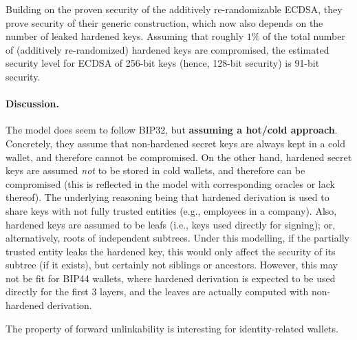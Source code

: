 Building on the proven security of the additively re-randomizable ECDSA, they
prove security of their generic construction, which now also depends on the
number of leaked hardened keys. Assuming that roughly $1\%$ of the total number
of (additively re-randomized) hardened keys are compromised, the estimated
security level for ECDSA of 256-bit keys (hence, 128-bit security) is 91-bit
security.

\paragraph{Discussion.} %
The model does seem to follow BIP32, but \textbf{assuming a hot/cold approach}.
Concretely, they assume that non-hardened secret keys are always kept in a cold
wallet, and therefore cannot be compromised. On the other hand, hardened secret
keys are assumed \emph{not} to be stored in cold wallets, and therefore can be
compromised (this is reflected in the model with corresponding oracles or lack
thereof). The underlying reasoning being that hardened derivation is used to
share keys with not fully trusted entities (e.g., employees in a company). Also,
hardened keys are assumed to be leafs (i.e., keys used directly for signing); or,
alternatively, roots of independent subtrees. Under this modelling, if the
partially trusted entity leaks the hardened key, this would only affect the
security of its subtree (if it exists), but certainly not siblings or ancestors.
However, this may not be fit for BIP44 wallets, where hardened derivation is
expected to be used directly for the first 3 layers, and the leaves are actually
computed with non-hardened derivation.

The property of forward unlinkability is interesting for identity-related
wallets.



